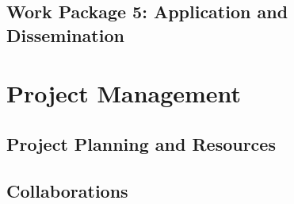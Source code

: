 \documentclass{llncs}
\begin{document}
\subsection{Work Package 5: Application and Dissemination}
\label{sec:wp5} 
 

\section{Project Management}

\subsection{Project Planning and Resources}
\label{sec:planning}
 

\subsection{Collaborations}
\label{sec:collaborations}
 




% 
\end{document}
